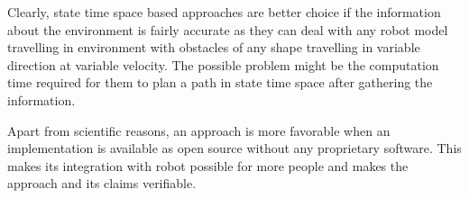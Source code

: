 Clearly, state time space based approaches are better choice if the information about the 
environment is fairly accurate as they can deal with any robot model travelling in environment 
with obstacles of any shape travelling in variable direction at variable velocity. The 
possible problem might be the computation time required for them to plan a path in state 
time space after gathering the information.

Apart from scientific reasons, an approach is more favorable when an implementation is 
available as open source without any proprietary software. This makes its integration with
robot possible for more people and makes the approach and its claims verifiable.

